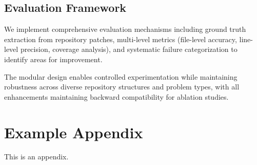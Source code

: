 \documentclass[11pt]{article}
\begin{document}
\subsection{Evaluation Framework}

We implement comprehensive evaluation mechanisms including ground truth extraction from repository patches, multi-level metrics (file-level accuracy, line-level precision, coverage analysis), and systematic failure categorization to identify areas for improvement.

The modular design enables controlled experimentation while maintaining robustness across diverse repository structures and problem types, with all enhancements maintaining backward compatibility for ablation studies.




\appendix

\section{Example Appendix}
\label{sec:appendix}

This is an appendix.
\end{document}
